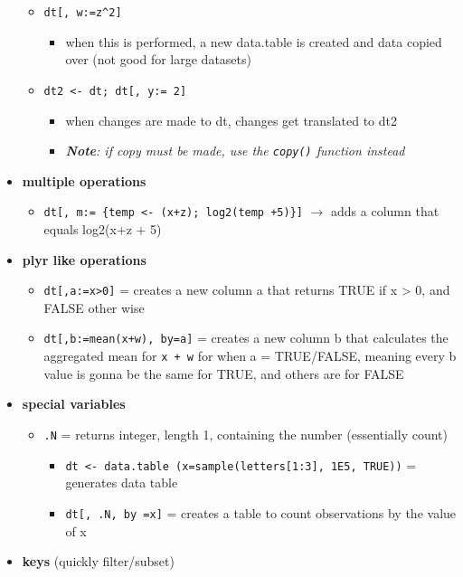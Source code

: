 \documentclass[
]{article}
\providecommand{\tightlist}{%
  \setlength{\itemsep}{0pt}\setlength{\parskip}{0pt}}
\begin{document}
\begin{itemize}
  \begin{itemize}
  \tightlist
  \item
    \texttt{dt{[},\ w:=z\^{}2{]}}

    \begin{itemize}
    \tightlist
    \item
      when this is performed, a new data.table is created and data
      copied over (not good for large datasets)
    \end{itemize}
  \item
    \texttt{dt2\ \textless{}-\ dt;\ dt{[},\ y:=\ 2{]}}

    \begin{itemize}
    \tightlist
    \item
      when changes are made to dt, changes get translated to dt2
    \item
      \emph{\textbf{Note}: if copy must be made, use the \texttt{copy()}
      function instead }
    \end{itemize}
  \end{itemize}
\item
  \textbf{multiple operations}

  \begin{itemize}
  \tightlist
  \item
    \texttt{dt{[},\ m:=\ \{temp\ \textless{}-\ (x+z);\ log2(temp\ +5)\}{]}}
    \(\rightarrow\) adds a column that equals log2(x+z + 5)
  \end{itemize}
\item
  \textbf{plyr like operations}

  \begin{itemize}
  \tightlist
  \item
    \texttt{dt{[},a:=x\textgreater{}0{]}} = creates a new column a that
    returns TRUE if x \textgreater{} 0, and FALSE other wise
  \item
    \texttt{dt{[},b:=mean(x+w),\ by=a{]}} = creates a new column b that
    calculates the aggregated mean for \texttt{x\ +\ w} for when a =
    TRUE/FALSE, meaning every b value is gonna be the same for TRUE, and
    others are for FALSE
  \end{itemize}
\item
  \textbf{special variables}

  \begin{itemize}
  \tightlist
  \item
    \texttt{.N} = returns integer, length 1, containing the number
    (essentially count)

    \begin{itemize}
    \tightlist
    \item
      \texttt{dt\ \textless{}-\ data.table\ (x=sample(letters{[}1:3{]},\ 1E5,\ TRUE))}
      = generates data table
    \item
      \texttt{dt{[},\ .N,\ by\ =x{]}} = creates a table to count
      observations by the value of x
    \end{itemize}
  \end{itemize}
\item
  \textbf{keys} (quickly filter/subset)


\end{itemize}
\end{document}
